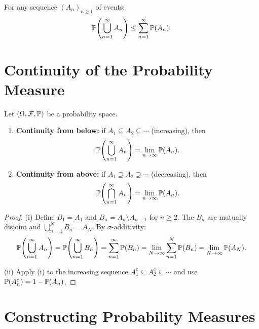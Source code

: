 \begin{corollary}
For any sequence $(A_n)_{n \geq 1}$ of events:
\[
    \mathbb{P}\!\left(\bigcup_{n=1}^{\infty} A_n\right)
    \leq \sum_{n=1}^{\infty} \mathbb{P}(A_n).
\]
\end{corollary}

\section{Continuity of the Probability Measure}

\begin{theorem}
\label{thm:continuity}
Let $(\Omega, \mathcal{F}, \mathbb{P})$ be a probability space.
\begin{enumerate}[label=(\roman*)]
    \item \textbf{Continuity from below:} if $A_1 \subseteq A_2 \subseteq \cdots$
    (increasing), then
    \[
        \mathbb{P}\!\left(\bigcup_{n=1}^{\infty} A_n\right)
        = \lim_{n \to \infty} \mathbb{P}(A_n).
    \]
    \item \textbf{Continuity from above:} if $A_1 \supseteq A_2 \supseteq \cdots$
    (decreasing), then
    \[
        \mathbb{P}\!\left(\bigcap_{n=1}^{\infty} A_n\right)
        = \lim_{n \to \infty} \mathbb{P}(A_n).
    \]
\end{enumerate}
\end{theorem}

\begin{proof}
(i) Define $B_1 = A_1$ and $B_n = A_n \setminus A_{n-1}$ for $n \geq 2$. The $B_n$
are mutually disjoint and $\bigcup_{n=1}^{N} B_n = A_N$. By $\sigma$-additivity:
\[
    \mathbb{P}\!\left(\bigcup_{n=1}^{\infty} A_n\right)
    = \mathbb{P}\!\left(\bigcup_{n=1}^{\infty} B_n\right)
    = \sum_{n=1}^{\infty} \mathbb{P}(B_n)
    = \lim_{N \to \infty} \sum_{n=1}^{N} \mathbb{P}(B_n)
    = \lim_{N \to \infty} \mathbb{P}(A_N).
\]

(ii) Apply (i) to the increasing sequence $A_1^c \subseteq A_2^c \subseteq \cdots$
and use $\mathbb{P}(A_n^c) = 1 - \mathbb{P}(A_n)$.
\end{proof}

\section{Constructing Probability Measures}

